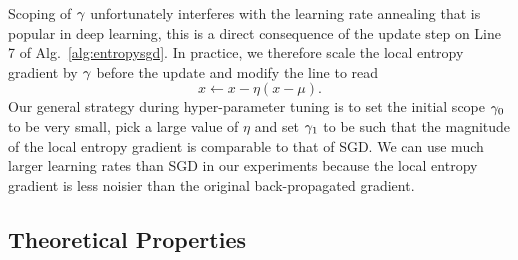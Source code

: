 \documentclass[10pt]{article}
\begin{document}
Scoping of $\gamma$ unfortunately interferes with the learning rate annealing that is popular in deep learning, this is a direct consequence of the update step on Line 7 of Alg.~\ref{alg:entropysgd}. In practice, we therefore scale the local entropy gradient by $\gamma$ before the update and modify the line to read
$$
    x \leftarrow x - \eta (x - \mu).
$$
Our general strategy during hyper-parameter tuning is to set the initial scope $\gamma_0$ to be very small, pick a large value of $\eta$ and set $\gamma_1$ to be such that the magnitude of the local entropy gradient is comparable to that of SGD. We can use much larger learning rates than SGD in our experiments because the local entropy gradient is less noisier than the original back-propagated gradient.


\subsection{Theoretical Properties}
\label{ss:theoretical_properties}
\end{document}
